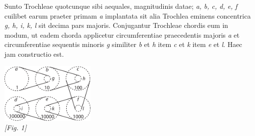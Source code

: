                 \vspace*{8mm}
                \pstart 
                \normalsize
             \pend \vspace{1.0ex}
            \pstart Sunto Trochleae\protect{} quotcunque sibi aequales, magnitudinis datae; \textit{a, b, c, d, e, f} cuilibet earum praeter primam \textit{a} implantata sit alia Trochlea\protect{} eminens concentrica \textit{g, h, i, k, l}  sit decima pars majoris. Conjugantur Trochleae\protect{} chordis eum in modum, ut eadem chorda applicetur circumferentiae praecedentis majoris \textit{a} et circumferentiae sequentis minoris \textit{g} similiter \textit{b} et \textit{h} item \textit{c} et \textit{k} item \textit{e} et \textit{l}. Haec jam constructio est.\pend
              \vspace{1.0ex}
              \begin{center}
              \includegraphics[width=0.35\textwidth]{images/35_12_1_327r}
              \vspace{0.5ex}
              \\\textit{[Fig. 1]}
              \end{center}
            \pstart 
